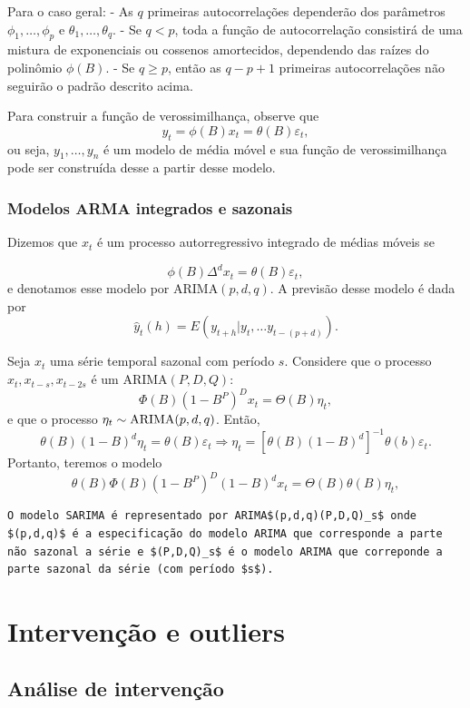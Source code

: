 \documentclass[
  letterpaper,
  DIV=11,
  numbers=noendperiod]{scrartcl}
\theoremstyle{definition}
\theoremstyle{definition}
\theoremstyle{plain}
\theoremstyle{plain}
\theoremstyle{remark}
\begin{document}
Para o caso geral: - As \(q\) primeiras autocorrelações dependerão dos
parâmetros \(\phi_1,\ldots,\phi_p\) e \(\theta_1,\ldots,\theta_q\). - Se
\(q<p\), toda a função de autocorrelação consistirá de uma mistura de
exponenciais ou cossenos amortecidos, dependendo das raízes do polinômio
\(\phi(B)\). - Se \(q\geq p\), então as \(q-p+1\) primeiras
autocorrelações não seguirão o padrão descrito acima.

Para construir a função de verossimilhança, observe que
\[y_t=\phi(B)x_t=\theta(B)\varepsilon_t,\] ou seja, \(y_1,\ldots,y_n\) é
um modelo de média móvel e sua função de verossimilhança pode ser
construída desse a partir desse modelo.

\subsection{Modelos ARMA integrados e
sazonais}\label{modelos-arma-integrados-e-sazonais}

Dizemos que \(x_t\) é um processo autorregressivo integrado de médias
móveis se

\[\phi(B)\Delta^d x_t =\theta(B)\varepsilon_t,\] e denotamos esse modelo
por ARIMA\((p,d,q)\). A previsão desse modelo é dada por
\[\hat{y}_t(h)=E(y_{t+h}|y_t,\ldots y_{t-(p+d)}).\]

Seja \(x_t\) uma série temporal sazonal com período \(s\). Considere que
o processo \({x_t,x_{t-s},x_{t-2s}}\) é um ARIMA\((P,D,Q)\):
\[\Phi(B)(1-B^P)^Dx_t = \Theta(B)\eta_t,\] e que o processo
\(\eta_t\sim \hbox{ARIMA}(p,d,q)\). Então,
\[\theta(B)(1-B)^d\eta_t = \theta(B)\varepsilon_t\Rightarrow \eta_t = \left[\theta(B)(1-B)^d\right]^{-1}\theta(b)\varepsilon_t.\]
Portanto, teremos o modelo
\[\theta(B)\Phi(B)(1-B^P)^D(1-B)^dx_t = \Theta(B)\theta(B)\eta_t,\]

\begin{verbatim}
O modelo SARIMA é representado por ARIMA$(p,d,q)(P,D,Q)_s$ onde $(p,d,q)$ é a especificação do modelo ARIMA que corresponde a parte não sazonal a série e $(P,D,Q)_s$ é o modelo ARIMA que correponde a parte sazonal da série (com período $s$).
\end{verbatim}


\chapter{Intervenção e outliers}\label{intervenuxe7uxe3o-e-outliers}

\section{Análise de intervenção}\label{anuxe1lise-de-intervenuxe7uxe3o}
\end{document}
